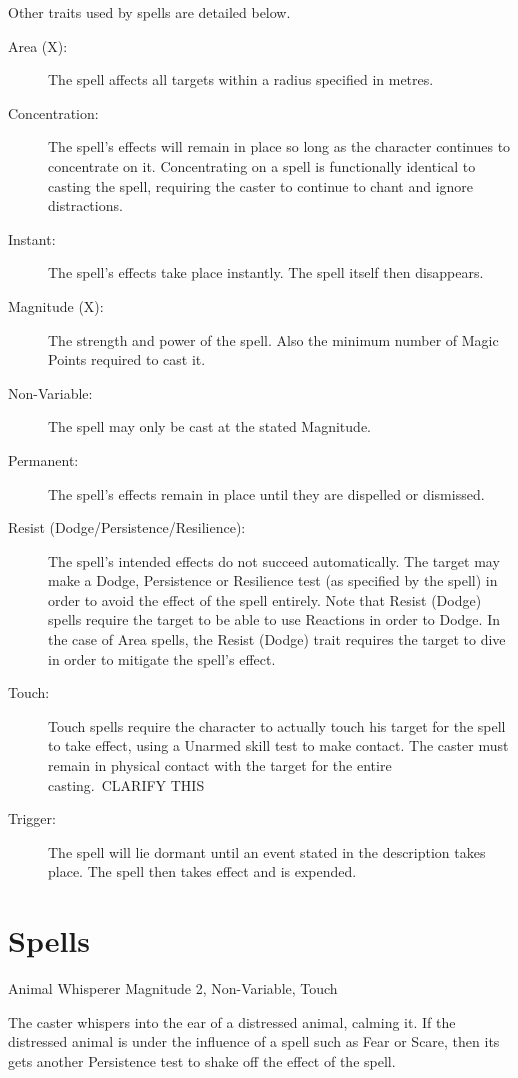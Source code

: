 Other traits used by spells are detailed below. 
\begin{description}
	\item[Area (X):] The spell affects all targets within a radius specified in metres. 
	\item[Concentration:] The spell’s effects will remain in place so long as the character continues to concentrate on it. Concentrating on a spell is functionally identical to casting the spell, requiring the caster to continue to chant and ignore distractions. 
	\item[Instant:] The spell’s effects take place instantly. The spell itself then disappears. 
	\item[Magnitude (X):] The strength and power of the spell. Also the minimum number of Magic Points required to cast it. 
	\item[Non-Variable:] The spell may only be cast at the stated Magnitude.
	\item[Permanent:] The spell’s effects remain in place until they are dispelled or dismissed. 
	\item[Resist (Dodge/Persistence/Resilience):] The spell’s intended effects do not succeed automatically. The target may make a Dodge, Persistence or Resilience test (as specified by the spell) in order to avoid the effect of the spell entirely. Note that Resist (Dodge) spells require the target to be able to use Reactions in order to Dodge. In the case of Area spells, the Resist (Dodge) trait requires the target to dive in order to mitigate the spell’s effect. 
	\item[Touch:] Touch spells require the character to actually touch his target for the spell to take effect, using a Unarmed skill test to make contact. The caster must remain in physical contact with the target for the entire casting. CLARIFY THIS
	\item[Trigger:] The spell will lie dormant until an event stated in the description takes place. The spell then takes effect and is expended.
\end{description}

\section{Spells}

\begin{rpg-spell}
{Animal Whisperer}
{Magnitude 2, Non-Variable, Touch}

The caster whispers into the ear of a distressed animal, calming it. If the distressed animal is under the influence of a spell such as Fear or Scare, then its gets another Persistence test to shake off the effect of the spell.
\end{rpg-spell}


